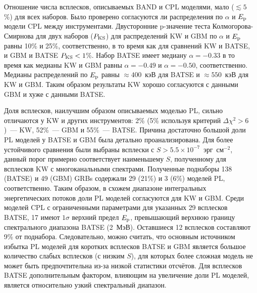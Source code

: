 Отношение числа всплесков, описываемых BAND и CPL моделями, мало ($\lesssim 5$\%)
для всех наборов. Было проверено согласуются ли распределения по $\alpha$ и 
$E_{\mathrm{p}}$ модели CPL между инструментами. Двусторонние p-значение 
теста Колмогорова-Смирнова для двух наборов ($P_{\mathrm{KS}}$) для распределений 
KW и GBM по $\alpha$ и $E_{\mathrm{p}}$ равны 10\% и 25\%, соответственно, в то время 
как для сравнений KW и BATSE, и GBM и BATSE $P_{\mathrm{KS}}<1$\%.
Набор BATSE имеет медиану $\alpha=-0.33$ в то время как медианы KW и GBM равны
$\alpha=-0.49$ и $\alpha=-0.50$, соответственно.
Медианы распределений по $E_{\mathrm{p}}$ равны $\approx 400$~кэВ для BATSE и 
$\approx 550$~кэВ для KW и GBM.
Таким образом результаты KW хорошо согласуются с данными GBM и хуже с данными BATSE.

Доля всплесков, наилучшим образом описываемых моделью PL, сильно отличаются у KW и
других инструментов:
2\% (5\% используя критерий $\Delta \chi^2 > 6$)~--- KW, 52\%~--- GBM и 55\%~--- BATSE.
Причина достаточно большой доли PL моделей у BATSE и GBM была детально проанализирована.
Для более устойчивого сравнения были выбраны всплески с $S>5.5\times 10^{-7}$~эрг~см$^{-2}$,
данный порог примерно соответствует наименьшему $S$, полученному для всплесков KW с многоканальными
спектрами. Полученные поднаборы 138 (BATSE) и 49 (GBM) GRBs содержали 29 (21\%) и 3 (6\%) моделей PL, соответственно. 
Таким образом, в схожем диапазоне интегральных энергетических потоков доли PL моделей
согласуются для KW и GBM.
Среди моделей CPL с ограниченными параметрами для указанных 29 всплесков BATSE,
17 имеют $1\sigma$ верхний предел $E_{\mathrm{p}}$, превышающий верхнюю границу 
спектрального диапазона  BATSE (2~МэВ). Оставшиеся 12 всплесков составляют 9\% от поднабора. 
Следовательно, можно считать, что основным источником избытка PL моделей для коротких 
всплесков BATSE и GBM является большое количество слабых всплесков (с низким $S$),
для которых более сложная модель не может быть предпочтительна из-за низкой статистики отсчётов.
Для всплесков BATSE дополнительным фактором, влияющим на увеличение доли PL моделей, 
является относительно узкий спектральный диапазон.

